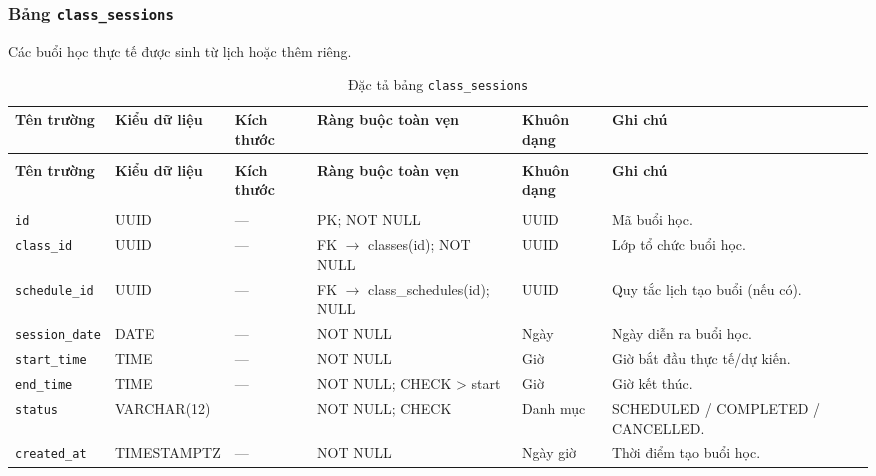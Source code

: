 \subsubsection{Bảng \texttt{class\_sessions}}
Các buổi học thực tế được sinh từ lịch hoặc thêm riêng.

\begingroup
\fontsize{9.2}{11.2}\selectfont
\setlength{\tabcolsep}{2.4pt}
\renewcommand{\arraystretch}{1.22}
\begin{longtable}{|>{\raggedright\arraybackslash}p{2.25cm}|>{\raggedright\arraybackslash}p{2.48cm}|>{\raggedright\arraybackslash}p{0.95cm}|>{\raggedright\arraybackslash}p{3.0cm}|>{\raggedright\arraybackslash}p{1.25cm}|>{\raggedright\arraybackslash}p{4.27cm}|}
\caption{Đặc tả bảng \texttt{class\_sessions}}\label{tab:csdl:class_sessions}\\
\hline\rowcolor{blue!11}\textbf{Tên trường}&\textbf{Kiểu dữ liệu}&\textbf{Kích thước}&\textbf{Ràng buộc toàn vẹn}&\textbf{Khuôn dạng}&\textbf{Ghi chú}\\\hline
\endfirsthead
\multicolumn{6}{r}{\textit{Tiếp bảng \texttt{class\_sessions}}}\\
\hline\rowcolor{blue!11}\textbf{Tên trường}&\textbf{Kiểu dữ liệu}&\textbf{Kích thước}&\textbf{Ràng buộc toàn vẹn}&\textbf{Khuôn dạng}&\textbf{Ghi chú}\\\hline
\endhead
\hline\multicolumn{6}{r}{\footnotesize\textit{Còn tiếp trang sau}}\\
\endfoot
\hline
\endlastfoot
\texttt{id} & UUID & — & PK; NOT NULL & UUID & Mã buổi học.\\\hline
\rowcolor{gray!5}
\texttt{class\_\allowbreak{}id} & UUID & — & FK $\rightarrow$ classes(id); NOT NULL & UUID & Lớp tổ chức buổi học.\\\hline
\texttt{schedule\_\allowbreak{}id} & UUID & — & FK $\rightarrow$ class\_\allowbreak{}schedules(id); NULL & UUID & Quy tắc lịch tạo buổi (nếu có).\\\hline
\rowcolor{gray!5}
\texttt{session\_\allowbreak{}date} & DATE & — & NOT NULL & Ngày & Ngày diễn ra buổi học.\\\hline
\texttt{start\_\allowbreak{}time} & TIME & — & NOT NULL & Giờ & Giờ bắt đầu thực tế/dự kiến.\\\hline
\rowcolor{gray!5}
\texttt{end\_\allowbreak{}time} & TIME & — & NOT NULL; CHECK > start & Giờ & Giờ kết thúc.\\\hline
\texttt{status} & VARCHAR(12) & 12 & NOT NULL; CHECK & Danh mục & SCHEDULED / COMPLETED / CANCELLED.\\\hline
\rowcolor{gray!5}
\texttt{created\_\allowbreak{}at} & TIMESTAMPTZ & — & NOT NULL & Ngày giờ & Thời điểm tạo buổi học.\\\hline
\end{longtable}
\endgroup

